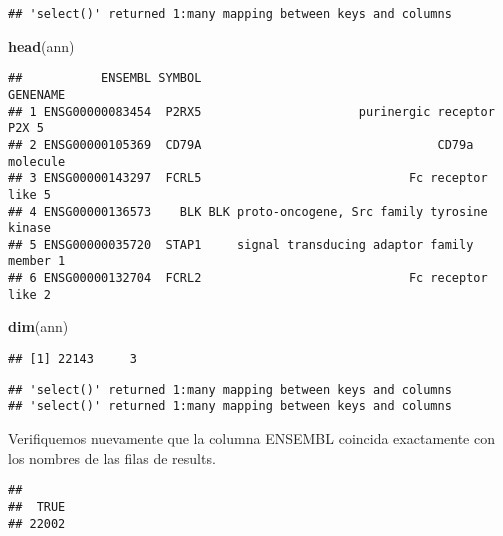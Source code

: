 \documentclass[
]{article}
\newenvironment{Shaded}{\begin{snugshade}}{\end{snugshade}}
\newcommand{\KeywordTok}[1]{\textcolor[rgb]{0.13,0.29,0.53}{\textbf{#1}}}
\newcommand{\NormalTok}[1]{#1}
\newcommand{\OperatorTok}[1]{\textcolor[rgb]{0.81,0.36,0.00}{\textbf{#1}}}
\begin{document}
\begin{verbatim}
## 'select()' returned 1:many mapping between keys and columns
\end{verbatim}

\begin{Shaded}
\begin{Highlighting}[]
\KeywordTok{head}\NormalTok{(ann)}
\end{Highlighting}
\end{Shaded}

\begin{verbatim}
##           ENSEMBL SYMBOL                                       GENENAME
## 1 ENSG00000083454  P2RX5                      purinergic receptor P2X 5
## 2 ENSG00000105369  CD79A                                 CD79a molecule
## 3 ENSG00000143297  FCRL5                             Fc receptor like 5
## 4 ENSG00000136573    BLK BLK proto-oncogene, Src family tyrosine kinase
## 5 ENSG00000035720  STAP1     signal transducing adaptor family member 1
## 6 ENSG00000132704  FCRL2                             Fc receptor like 2
\end{verbatim}

\begin{Shaded}
\begin{Highlighting}[]
\KeywordTok{dim}\NormalTok{(ann)}
\end{Highlighting}
\end{Shaded}

\begin{verbatim}
## [1] 22143     3
\end{verbatim}

\begin{verbatim}
## 'select()' returned 1:many mapping between keys and columns
## 'select()' returned 1:many mapping between keys and columns
\end{verbatim}

Verifiquemos nuevamente que la columna ENSEMBL coincida exactamente con
los nombres de las filas de results.

\begin{Shaded}
\end{Shaded}

\begin{verbatim}
## 
##  TRUE 
## 22002
\end{verbatim}
\end{document}
